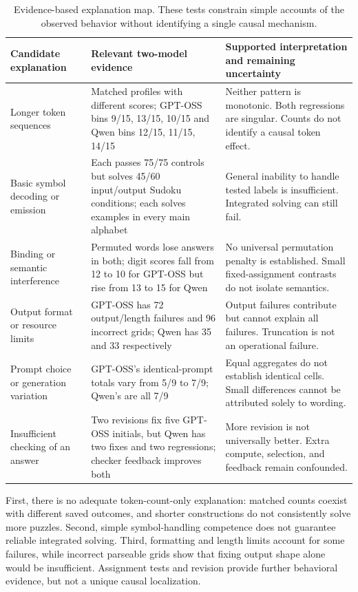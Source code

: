 \documentclass[11pt]{article}
\begin{document}
\begin{table}[t]
\centering\small
\begin{tabular}{p{3.0cm}p{5.6cm}p{6.0cm}}
\toprule
Candidate explanation & Relevant two-model evidence & Supported interpretation and remaining uncertainty\\
\midrule
Longer token sequences & Matched profiles with different scores; GPT-OSS bins 9/15, 13/15, 10/15 and Qwen bins 12/15, 11/15, 14/15 & Neither pattern is monotonic. Both regressions are singular. Counts do not identify a causal token effect.\\
\addlinespace
Basic symbol decoding or emission & Each passes 75/75 controls but solves 45/60 input/output Sudoku conditions; each solves examples in every main alphabet & General inability to handle tested labels is insufficient. Integrated solving can still fail.\\
\addlinespace
Binding or semantic interference & Permuted words lose answers in both; digit scores fall from 12 to 10 for GPT-OSS but rise from 13 to 15 for Qwen & No universal permutation penalty is established. Small fixed-assignment contrasts do not isolate semantics.\\
\addlinespace
Output format or resource limits & GPT-OSS has 72 output/length failures and 96 incorrect grids; Qwen has 35 and 33 respectively & Output failures contribute but cannot explain all failures. Truncation is not an operational failure.\\
\addlinespace
Prompt choice or generation variation & GPT-OSS's identical-prompt totals vary from 5/9 to 7/9; Qwen's are all 7/9 & Equal aggregates do not establish identical cells. Small differences cannot be attributed solely to wording.\\
\addlinespace
Insufficient checking of an answer & Two revisions fix five GPT-OSS initials, but Qwen has two fixes and two regressions; checker feedback improves both & More revision is not universally better. Extra compute, selection, and feedback remain confounded.\\
\bottomrule
\end{tabular}
\caption{Evidence-based explanation map. These tests constrain simple accounts of the observed behavior without identifying a single causal mechanism.}
\label{tab:explanations}
\end{table}

First, there is no adequate token-count-only explanation: matched counts coexist with different saved outcomes, and shorter constructions do not consistently solve more puzzles. Second, simple symbol-handling competence does not guarantee reliable integrated solving. Third, formatting and length limits account for some failures, while incorrect parseable grids show that fixing output shape alone would be insufficient. Assignment tests and revision provide further behavioral evidence, but not a unique causal localization.
\end{document}
